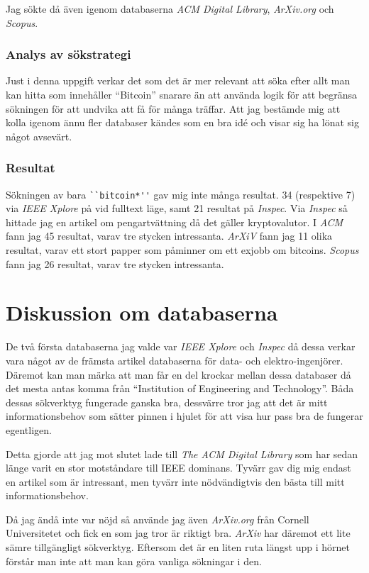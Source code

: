 \documentclass[a4paper,11pt,exjobb]{kth-mag}
\begin{document}
Jag sökte då även igenom databaserna \textit{ACM Digital Library}, \textit{ArXiv.org} och \textit{Scopus}\cite{scopus}.

\subsubsection{Analys av sökstrategi}
Just i denna uppgift verkar det som det är mer relevant att söka efter allt man kan hitta som innehåller ``Bitcoin'' snarare än att använda logik för att begränsa sökningen för att undvika att få för många träffar. Att jag bestämde mig att kolla igenom ännu fler databaser kändes som en bra idé och visar sig ha lönat sig något avsevärt.

\subsubsection{Resultat}
Sökningen av bara \verb#``bitcoin*''# gav mig inte många resultat. 34 (respektive 7) via \textit{IEEE Xplore} på vid fulltext läge, samt 21 resultat på \textit{Inspec}. 
Via \textit{Inspec} så hittade jag en artikel om pengartvättning då det gäller kryptovalutor\cite{Stokes}.
I \textit{ACM} fann jag 45 resultat, varav tre stycken intressanta\cite{Christ, Martins}.
\textit{ArXiV} fann jag 11 olika resultat, varav ett stort papper som påminner om ett exjobb om bitcoins\cite{bitsc}. 
\textit{Scopus} fann jag 26 resultat, varav tre stycken intressanta\cite{scoop1, scoop2, scoop3}.

\section{Diskussion om databaserna}
De två första databaserna jag valde var \textit{IEEE Xplore} och \textit{Inspec} då dessa verkar vara något av de främsta artikel databaserna för data- och elektro-ingenjörer. Däremot kan man märka att man får en del krockar mellan dessa databaser då det mesta antas komma från ``Institution of Engineering and Technology''. Båda dessas sökverktyg fungerade ganska bra, dessvärre tror jag att det är mitt informationsbehov som sätter pinnen i hjulet för att visa hur pass bra de fungerar egentligen.

Detta gjorde att jag mot slutet lade till \textit{The ACM Digital Library} som har sedan länge varit en stor motståndare till IEEE dominans. Tyvärr gav dig mig endast en artikel som är intressant, men tyvärr inte nödvändigtvis den bästa till mitt informationsbehov. 

Då jag ändå inte var nöjd så använde jag även \textit{ArXiv.org} från Cornell Universitetet och fick en som jag tror är riktigt bra. \textit{ArXiv} har däremot ett lite sämre tillgängligt sökverktyg. Eftersom det är en liten ruta längst upp i hörnet förstår man inte att man kan göra vanliga sökningar i den.
\end{document}
